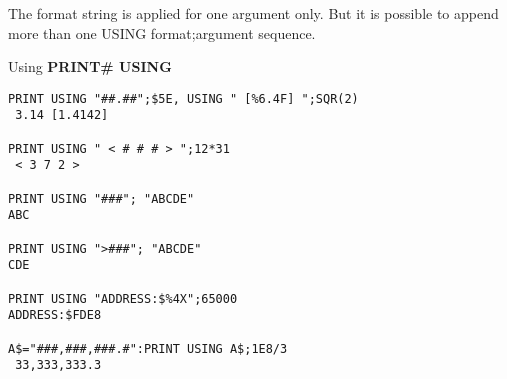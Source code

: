 \begin{description}[leftmargin=2cm,style=nextline]
\item [Remarks:] The format string is applied for one argument only.
                 But it is possible to append more than one
                 USING format;argument sequence.


\newpage
\item [Example:] Using {\bf PRINT\# USING}

\begin{tcolorbox}[colback=black,coltext=white]
\verbatimfont{\codefont}
\begin{verbatim}
PRINT USING "##.##";$5E, USING " [%
 3.14 [1.4142]

PRINT USING " < # # # > ";12*31
 < 3 7 2 >

PRINT USING "###"; "ABCDE"
ABC

PRINT USING ">###"; "ABCDE"
CDE

PRINT USING "ADDRESS:$%
ADDRESS:$FDE8

A$="###,###,###.#":PRINT USING A$;1E8/3
 33,333,333.3
\end{verbatim}
\end{tcolorbox}
\end{description}


